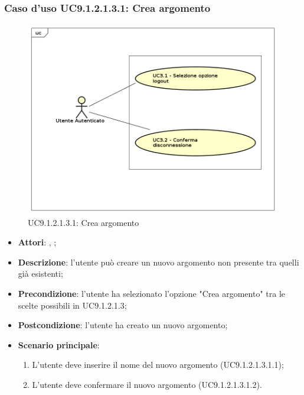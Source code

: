 						\subsubsection{Caso d'uso UC9.1.2.1.3.1: Crea argomento}
						\label{UC9.1.2.1.3.1}
						\begin{figure}[h]
							\centering
						\includegraphics[scale=0.7,keepaspectratio]{UML/UC9.png}
							\caption{UC9.1.2.1.3.1: Crea argomento}
						\end{figure}
						\FloatBarrier
						\begin{itemize}
							\item \textbf{Attori}: \uau, \uaupro;
							\item \textbf{Descrizione}: l'utente può creare un nuovo argomento non presente tra quelli già esistenti;
							\item \textbf{Precondizione}: l'utente ha selezionato l'opzione "Crea argomento" tra le scelte possibili in UC9.1.2.1.3;
							\item \textbf{Postcondizione}: l'utente ha creato un nuovo argomento; 
							\item \textbf{Scenario principale}:
								\begin{enumerate}
									\item L'utente deve inserire il nome del nuovo argomento (UC9.1.2.1.3.1.1);
									\item L'utente deve confermare il nuovo argomento (UC9.1.2.1.3.1.2).
								\end{enumerate}
						\end{itemize}
						

